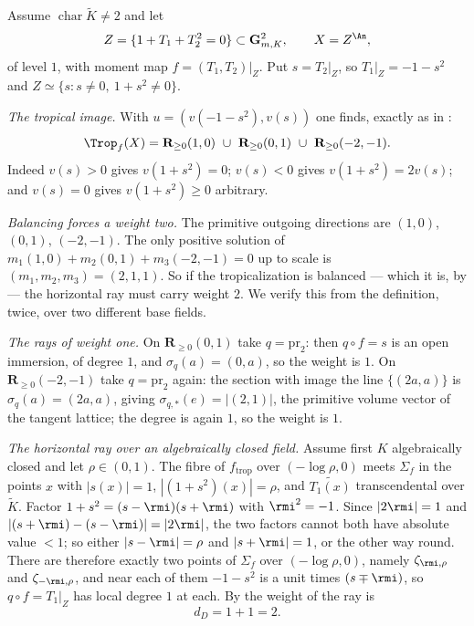 \begin{example}
\label{ex:trop-multiplicity-two}
Assume $\operatorname{char}\widetilde K\ne2$ and let
\[
 Z=\{1+T_1+T_2^2=0\}\subset\mathbf G_{m,K}^2,
 \qquad X=Z^{\An},
\]
of level $1$, with moment map $f=(T_1,T_2)|_Z$. Put $s=T_2|_Z$, so
$T_1|_Z=-1-s^2$ and $Z\simeq\{s:s\ne0,\ 1+s^2\ne0\}$.

\emph{The tropical image.} With $u=(v(-1-s^2),v(s))$ one finds, exactly as
in :
\[
 \Trop_f(X)=\mathbf R_{\ge0}(1,0)\ \cup\ \mathbf R_{\ge0}(0,1)
 \ \cup\ \mathbf R_{\ge0}(-2,-1).
\]
Indeed $v(s)>0$ gives $v(1+s^2)=0$; $v(s)<0$ gives $v(1+s^2)=2v(s)$; and
$v(s)=0$ gives $v(1+s^2)\ge0$ arbitrary.

\emph{Balancing forces a weight two.} The primitive outgoing directions are
$(1,0)$, $(0,1)$, $(-2,-1)$. The only positive solution of
$m_1(1,0)+m_2(0,1)+m_3(-2,-1)=0$ up to scale is
$(m_1,m_2,m_3)=(2,1,1)$. So if the tropicalization is balanced --- which it
is, by  --- the horizontal ray must
carry weight $2$. We verify this from the definition, twice, over two
different base fields.

\emph{The rays of weight one.} On $\mathbf R_{\ge0}(0,1)$ take
$q=\mathrm{pr}_2$: then $q\circ f=s$ is an open immersion, of degree $1$, and
$\sigma_q(a)=(0,a)$, so the weight is $1$. On
$\mathbf R_{\ge0}(-2,-1)$ take $q=\mathrm{pr}_2$ again: the section with
image the line $\{(2a,a)\}$ is $\sigma_q(a)=(2a,a)$, giving
$\sigma_{q,*}(e)=|(2,1)|$, the primitive volume vector of the tangent
lattice; the degree is again $1$, so the weight is $1$.

\emph{The horizontal ray over an algebraically closed field.} Assume first
$K$ algebraically closed and let $\rho\in(0,1)$. The fibre of
$f_{\mathrm{trop}}$ over $(-\log\rho,0)$ meets $\Sigma_f$ in the points $x$
with $|s(x)|=1$, $|(1+s^2)(x)|=\rho$, and $\widetilde{T_1(x)}$ transcendental
over $\widetilde K$. Factor $1+s^2=(s-\rmi)(s+\rmi)$ with $\rmi^2=-1$. Since
$|2\rmi|=1$ and $|(s+\rmi)-(s-\rmi)|=|2\rmi|$, the two factors cannot both
have absolute value $<1$; so either $|s-\rmi|=\rho$ and $|s+\rmi|=1$, or the
other way round. There are therefore exactly two points of $\Sigma_f$ over
$(-\log\rho,0)$, namely $\zeta_{\rmi,\rho}$ and $\zeta_{-\rmi,\rho}$, and
near each of them $-1-s^2$ is a unit times $(s\mp\rmi)$, so
$q\circ f=T_1|_Z$ has local degree $1$ at each. By
 the weight of the ray is
\[
 d_D=1+1=2 .
\]


\end{example}

